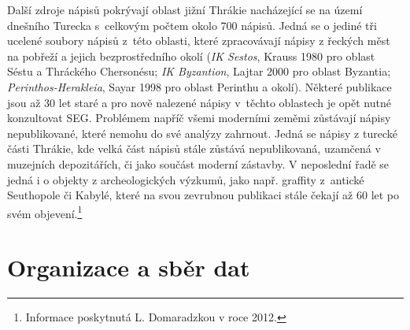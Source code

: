 Další zdroje nápisů pokrývají oblast jižní Thrákie nacházející se na území dnešního Turecka s~celkovým počtem okolo 700 nápisů. Jedná se o jediné tři ucelené soubory nápisů z~této oblasti, které zpracovávají nápisy z řeckých měst na pobřeží a jejich bezprostředního okolí ({\em IK Sestos}, Krauss 1980 pro oblast Séstu a Thráckého Chersonésu; {\em IK Byzantion}, Lajtar 2000 pro oblast Byzantia; {\em Perinthos-Herakleia}, Sayar 1998 pro oblast Perinthu a okolí). Některé publikace jsou až 30 let staré a pro nově nalezené nápisy v~těchto oblastech je opět nutné konzultovat SEG. Problémem napříč všemi moderními zeměmi zůstávají nápisy nepublikované, které nemohu do své analýzy zahrnout. Jedná se nápisy z turecké části Thrákie, kde velká část nápisů stále zůstává nepublikovaná, uzamčená v muzejních depozitářích, či jako součást moderní zástavby. V neposlední řadě se jedná i o objekty z archeologických výzkumů, jako např. graffity z~antické Seuthopole či Kabylé, které na svou zevrubnou publikaci stále čekají až 60 let po svém objevení.\footnote{Informace poskytnutá L. Domaradzkou v roce 2012.}

\section[organizace-a-sběr-dat]{Organizace a sběr dat}

